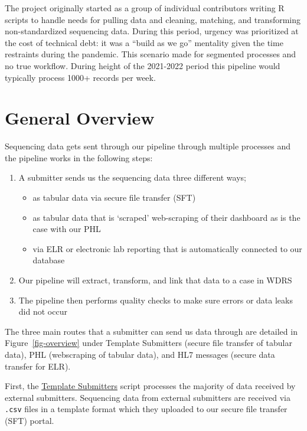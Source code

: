 \documentclass[
  letterpaper,
  DIV=11,
  numbers=noendperiod]{scrartcl}
\providecommand{\tightlist}{%
  \setlength{\itemsep}{0pt}\setlength{\parskip}{0pt}}\usepackage{longtable,booktabs,array}
\begin{document}
The project originally started as a group of individual contributors
writing R scripts to handle needs for pulling data and cleaning,
matching, and transforming non-standardized sequencing data\hspace{0pt}.
During this period, urgency was prioritized at the cost of technical
debt: it was a ``build as we go''\hspace{0pt} mentality given the time
restraints during the pandemic. This scenario made for segmented
processes and no true workflow. During height of the 2021-2022 period
this pipeline would typically process 1000+ records per
week\hspace{0pt}.

\section{General Overview}\label{sec-overview}

Sequencing data gets sent through our pipeline through multiple
processes and the pipeline works in the following steps:

\begin{enumerate}
\def\labelenumi{\arabic{enumi}.}
\tightlist
\item
  A submitter sends us the sequencing data three different ways;

  \begin{itemize}
  \tightlist
  \item
    as tabular data via secure file transfer (SFT)
  \item
    as tabular data that is `scraped' web-scraping of their dashboard as
    is the case with our PHL
  \item
    via ELR or electronic lab reporting that is automatically connected
    to our database
  \end{itemize}
\item
  Our pipeline will extract, transform, and link that data to a case in
  WDRS
\item
  The pipeline then performs quality checks to make sure errors or data
  leaks did not occur
\end{enumerate}

The three main routes that a submitter can send us data through are
detailed in Figure~\ref{fig-overview} under Template Submitters (secure
file transfer of tabular data), PHL (webscraping of tabular data), and
HL7 messages (secure data transfer for ELR).

First, the \href{@sec-template}{Template Submitters} script processes
the majority of data received by external submitters. Sequencing data
from external submitters are received via \texttt{.csv} files in a
template format which they uploaded to our secure file transfer (SFT)
portal.
\end{document}
